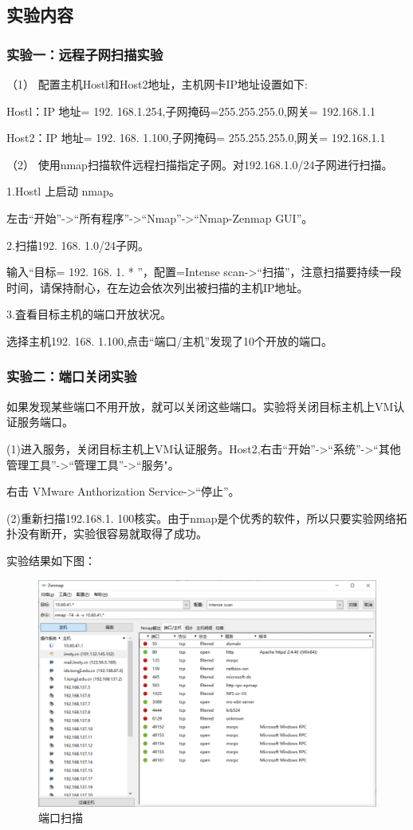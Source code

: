 \documentclass[lang=cn,11pt,a4paper,cite=authoryear]{elegantpaper}
\begin{document}
\subsection{实验内容}

\subsubsection{实验一：远程子网扫描实验}

（1）	配置主机Hostl和Host2地址，主机网卡IP地址设置如下: 

Hostl：IP 地址= 192. 168.1.254,子网掩码=255.255.255.0,网关= 192.168.1.1

Host2：IP 地址= 192. 168. 1.100,子网掩码= 255.255.255.0,网关= 192.168.1.1

（2）	使用nmap扫描软件远程扫描指定子网。对192.168.1.0/24子网进行扫描。

1.Hostl 上启动 nmap。

左击“开始”->“所有程序”->“Nmap”->“Nmap-Zenmap GUI”。

2.扫描192. 168. 1.0/24子网。

输入“目标= 192. 168. 1. * ”，配置=Intense scan->“扫描”，注意扫描要持续一段时间，请保持耐心，在左边会依次列出被扫描的主机IP地址。

3.査看目标主机的端口开放状况。

选择主机192. 168. 1.100,点击“端口/主机”发现了10个开放的端口。

\subsubsection{实验二：端口关闭实验}

如果发现某些端口不用开放，就可以关闭这些端口。实验将关闭目标主机上VM认证服务端口。

(1)进入服务，关闭目标主机上VM认证服务。Host2,右击“开始”->“系统”->“其他管理工具”->“管理工具”->“服务"。

右击 VMware Anthorization Service->“停止”。

(2)重新扫描192.168.1. 100核实。由于nmap是个优秀的软件，所以只要实验网络拓扑没有断开，实验很容易就取得了成功。

实验结果如下图：

\begin{figure}[htbp]
	\centering
	\includegraphics[width=0.7\linewidth]{image/screenshot010}
	\caption{端口扫描}
	\label{fig:screenshot010}
\end{figure}
\end{document}
